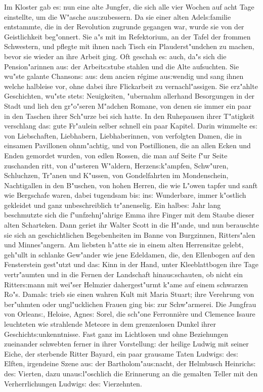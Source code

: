 \documentclass[oneside,12pt]{book}
\newenvironment{antiqua}{\normalfont}{}%
\newcommand{\s}{s:}%
\begin{document}
Im Kloster gab e{\s} nun eine alte Jungfer, die sich alle vier
Wochen auf acht Tage einstellte, um die W"asche au{\s}zubessern.
Da sie einer alten Adel{\s}familie entstammte, die in der
Revolution zugrunde gegangen war, wurde sie von der Geistlichkeit
beg"onnert. Sie a"s mit im Refektorium, an der Tafel der frommen
Schwestern, und pflegte mit ihnen nach Tisch ein Plauderst"undchen
zu machen, bevor sie wieder an ihre Arbeit ging. Oft geschah e{\s}
auch, da"s sich die Pension"arinnen au{\s} der Arbeit{\s}stube
stahlen und die Alte aufsuchten. Sie wu"ste galante Chanson{\s}
au{\s} dem \begin{antiqua}ancien r\'egime\end{antiqua}
au{\s}wendig und sang ihnen welche halbleise vor, ohne dabei ihre
Flickarbeit zu vernachl"assigen. Sie erz"ahlte Geschichten, wu"ste
stet{\s} Neuigkeiten, "ubernahm allerhand Besorgungen in der Stadt
und lieh den gr"o"seren M"adchen Romane, von denen sie immer ein
paar in den Taschen ihrer Sch"urze bei sich hatte. In den
Ruhepausen ihrer T"atigkeit verschlang da{\s} gute Fr"aulein
selber schnell ein paar Kapitel. Darin wimmelte e{\s} von
Liebschaften, Liebhabern, Liebhaberinnen, von verfolgten Damen,
die in einsamen Pavillonen ohnm"achtig, und von Postillionen, die
an allen Ecken und Enden gemordet wurden, von edlen Rossen, die
man auf Seite f"ur Seite zuschanden ritt, von d"usteren W"aldern,
Herzen{\s}k"ampfen, Schw"uren, Schluchzen, Tr"anen und K"ussen,
von Gondelfahrten im Mondenschein, Nachtigallen in den B"uschen,
von hohen Herren, die wie L"owen tapfer und sanft wie Bergschafe
waren, dabei tugendsam bi{\s} in{\s} Wunderbare, immer k"ostlich
gekleidet und ganz unbeschreiblich tr"anenselig. Ein halbe{\s}
Jahr lang beschmutzte sich die f"unfzehnj"ahrige Emma ihre Finger
mit dem Staube dieser alten Scharteken. Dann geriet ihr Walter
Scott in die H"ande, und nun berauschte sie sich an
geschichtlichen Begebenheiten im Banne von Burgzinnen,
Ritters"alen und Minnes"angern. Am liebsten h"atte sie in einem
alten Herrensitze gelebt, geh"ullt in schlanke Gew"ander wie jene
Edeldamen, die, den Ellenbogen auf den Fensterstein gest"utzt und
da{\s} Kinn in der Hand, unter Kleeblattbogen ihre Tage
vertr"aumten und in die Fernen der Landschaft hinau{\s}schauten,
ob nicht ein Ritter{\s}mann mit wei"ser Helmzier dahergest"urmt
k"ame auf einem schwarzen Ro"s. Damal{\s} trieb sie einen wahren
Kult mit Maria Stuart; ihre Verehrung von ber"uhmten oder
ungl"ucklichen Frauen ging bi{\s} zur Schw"armerei. Die Jungfrau
von Orlean{\s}, Heloise, Agne{\s} Sorel, die sch"one Ferronni\`ere
und Clemence Isaure leuchteten wie strahlende Meteore in dem
grenzenlosen Dunkel ihrer Geschicht{\s}unkenntnisse. Fast ganz im
Lichtlosen und ohne Beziehungen zueinander schwebten ferner in
ihrer Vorstellung: der heilige Ludwig mit seiner Eiche, der
sterbende Ritter Bayard, ein paar grausame Taten Ludwig{\s} de{\s}
Elften, irgendeine Szene au{\s} der Bartholom"au{\s}nacht, der
Helmbusch Heinrich{\s} de{\s} Vierten, dazu unau{\s}l"oschlich die
Erinnerung an die gemalten Teller mit den Verherrlichungen
Ludwig{\s} de{\s} Vierzehnten.
\end{document}
